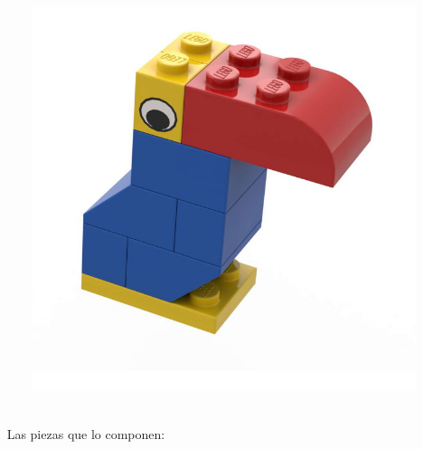 \documentclass[a4paper,10pt]{article}
\begin{document}
	\begin{figure}[h]
 	  \centering
 	  \includegraphics[scale=.2]{toucan.jpg}
	 \end{figure} \\ \
    \newpage
    \vfill
	 Las piezas que lo componen:
\end{document}
